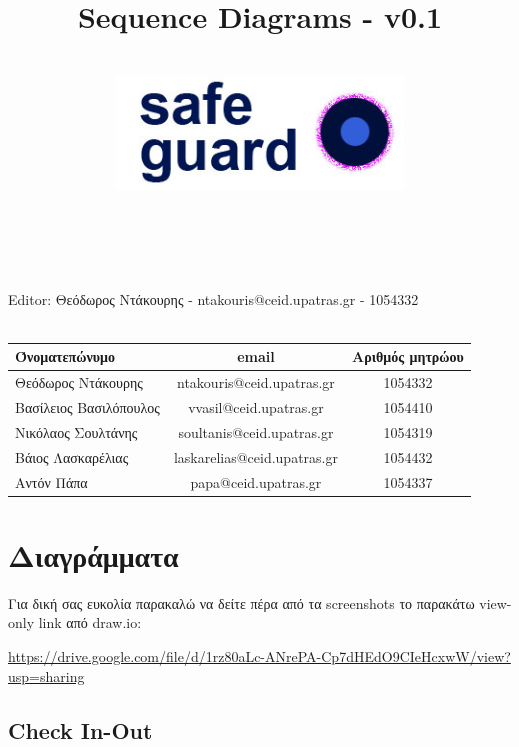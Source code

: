 \documentclass{article}
\title{Sequence Diagrams - v0.1}
\author{\\
\includegraphics[width=3in]{safeguard}\\[1ex]\\\\
}
\begin{document}
\maketitle

\newpage

\noident Editor: Θεόδωρος Ντάκουρης - ntakouris@ceid.upatras.gr - 1054332\\
\\

\begin{tabular}{|l|c|c|}
\hline
Όνοματεπώνυμο & email & Αριθμός μητρώου  \\
\hline
Θεόδωρος Ντάκουρης & ntakouris@ceid.upatras.gr & 1054332 \\
Βασίλειος Βασιλόπουλος & vvasil@ceid.upatras.gr &  1054410 \\
Νικόλαος Σουλτάνης & soultanis@ceid.upatras.gr & 1054319  \\
Βάιος Λασκαρέλιας & laskarelias@ceid.upatras.gr & 1054432 \\
Αντόν Πάπα & papa@ceid.upatras.gr & 1054337 \\
\hline
\end{tabular}

\renewcommand{\contentsname}{Περιεχόμενα}
\tableofcontents

\section{Διαγράμματα}
Για δική σας ευκολία παρακαλώ να δείτε πέρα από τα screenshots το παρακάτω view-only link από draw.io:

\url{https://drive.google.com/file/d/1rz80aLc-ANrePA-Cp7dHEdO9CIeHcxwW/view?usp=sharing}

\subsection{Check In-Out}
\end{document}
